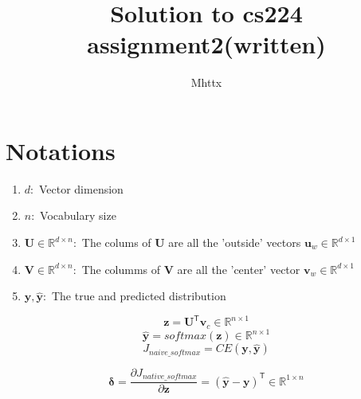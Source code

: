 \documentclass[a4paper]{article}
\begin{document}
\author{Mhttx}
\title{Solution to cs224 assignment2(written)}
\maketitle

\medskip

\section{Notations}
\begin{enumerate}
	\item $d:$ Vector dimension
	\item $n:$ Vocabulary size
	\item $\mathbf{U} \in \mathbb{R}^{d \times n}:$ The colums of $\mathbf{U}$ are all the 'outside' vectors $\mathbf{u}_{w} \in \mathbb{R}^{d \times 1}$

	\item $\mathbf{V} \in \mathbb{R}^{d \times n}:$ The columms of $\mathbf{V}$ are all the 'center' vector $\mathbf{v}_w \in \mathbb{R}^{d \times 1}$

	\item $\mathbf{y}, \mathbf{\hat{y}}:$ The true and predicted distribution 
\end{enumerate}

$$\mathbf{z}=\mathbf{U}^{\mathsf{T}}\mathbf{v}_c \in \mathbb{R}^{n \times 1}$$
$$\mathbf{\hat{y}}=softmax(\mathbf{z}) \in \mathbb{R}^{n \times 1}$$
$$J_{naive\_softmax}=CE(\mathbf{y, \hat{y}})$$

\begin{equation}
\mathbf{\delta} = \frac{\partial{J_{native\_softmax}}}{\partial{\mathbf{z}}}=(\mathbf{\hat{y}-y})^{\mathsf{T}} \in \mathbb{R}^{1 \times n}
\end{equation}
\end{document}
